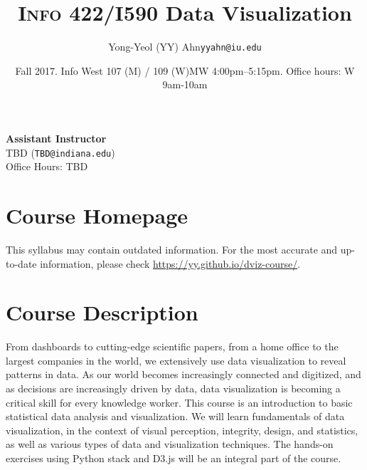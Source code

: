 \documentclass[11pt,article,oneside]{memoir}
\makeatletter
\def\myauthor{Author}
\def\mytitle{Title}
\def\myemail{yyahn@iu.edu}
\def\myauthor{Yong-Yeol (YY) Ahn}
\def\mytitle{{\normalsize \textsc{Info} 422/I590 \newline} \HUGE Data Visualization}
\makeatother
\begin{document}

\def\ind{\hangindent=1 true cm\hangafter=1 \noindent}
\def\labelitemi{$\cdot$}


\title{\LARGE \mytitle}     
\author{\Large\myauthor \newline \footnotesize\texttt{\noindent\myemail}}
\date{Fall 2017. Info West 107 (M) / 109 (W)\newline MW 4:00pm--5:15pm. \newline Office hours: W 9am-10am}

\maketitle

\vspace{-20pt}
{\bfseries Assistant Instructor} \\ TBD (\texttt{TBD@indiana.edu}) \\ Office Hours: TBD 

\section{Course Homepage}

This syllabus may contain outdated information. For the most accurate and
up-to-date information, please check \url{https://yy.github.io/dviz-course/}. 

\section{Course Description}

From dashboards to cutting-edge scientific papers, from a home office to the
largest companies in the world, we extensively use data visualization to reveal
patterns in data. As our world becomes increasingly connected and digitized,
and as decisions are increasingly driven by data, data visualization is
becoming a critical skill for every knowledge worker. This course is an
introduction to basic statistical data analysis and visualization. We will
learn fundamentals of data visualization, in the context of visual perception,
integrity, design, and statistics, as well as various types of data and
visualization techniques. The hands-on exercises using Python stack and D3.js
will be an integral part of the course. 
\end{document}
